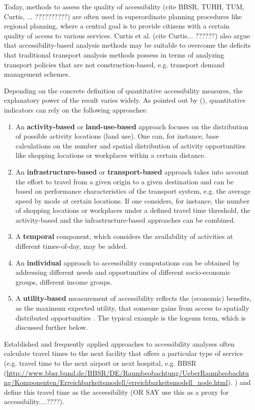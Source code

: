 Today, methods to assess the quality of accessibility (cite BBSR, TUHH, TUM, Curtis, ... ??????????) are often used in superordinate planning procedures like regional planning, where a central goal is to provide citizens with a certain quality of access to various services. Curtis et al. (cite Curtis... ??????) also argue that accessibility-based analysis methods may be suitable to overcome the deficits that traditional transport analysis methods possess in terms of analyzing transport policies that are not construction-based, e.g. transport demand management schemes.

Depending on the concrete definition of quantitative accessibility measures, the explanatory power of the result varies widely. As pointed out by \citet{GeursRitsema2001AccessibilityMeasures} (\citep[see also][]{Geurs2004AccessibilityReview}), quantitative indicators can rely on the following approaches:
%
\begin{enumerate}
\item An \textbf{activity-based} or \textbf{land-use-based} approach focuses on
the distribution of possible activity locations (land use). One can, for instance,
base calculations on the number and spatial distribution of activity opportunities
like shopping locations or workplaces within a certain distance.
%
\item An \textbf{in\-fra\-struc\-ture-based} or \textbf{transport-based} approach takes into account the effort to travel from a given origin to a given destination and 
can be based on performance characteristics of the transport system, e.g. the
average speed by mode at certain locations. If one considers, for instance, the
number of shopping locations or workplaces under a defined travel time threshold,
the activity-based and the infrastructure-based approaches can be combined.
%
\item A \textbf{temporal} component, which considers the availability of activities at different times-of-day, may be added.
%
\item An \textbf{individual} approach to accessibility computations can be
obtained by addressing different needs and opportunities of different socio-economic groups, \eg different income groups.
%
\item A \textbf{utility-based} measurement of accessibility reflects the
(economic) benefits, as the maximum expected utility, that someone gains
from access to spatially distributed opportunities
\citep{GeursRitsema2001AccessibilityMeasures,deJongEtAl2007LogsumTRA}. The
typical example is the logsum term, which is discussed further below.
\end{enumerate}
%
%
Established and frequently applied approaches to accessibility analyses often calculate travel times to the next facility that offers a particular type of service (e.g. travel time to the next airport or next hospital, e.g. BBSR (\url{http://www.bbsr.bund.de/BBSR/DE/Raumbeobachtung/UeberRaumbeobachtung/Komponenten/Erreichbarkeitsmodell/erreichbarkeitsmodell_node.html}). ) and define this travel time as the accessibility (OR SAY use this as a proxy for accessibility....????).

